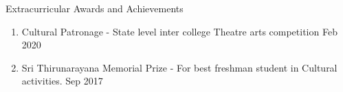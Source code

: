 \begin{rSection}{Extracurricular Awards and Achievements} 
\begin{enumerate}[itemsep=-0.5em, leftmargin=0.5em]
    \item []Cultural Patronage - State level inter college Theatre arts competition \hfill Feb 2020
    \item [] Sri Thirunarayana Memorial Prize - For best freshman student in Cultural activities. \hfill Sep 2017

\end{enumerate}
\end{rSection}
